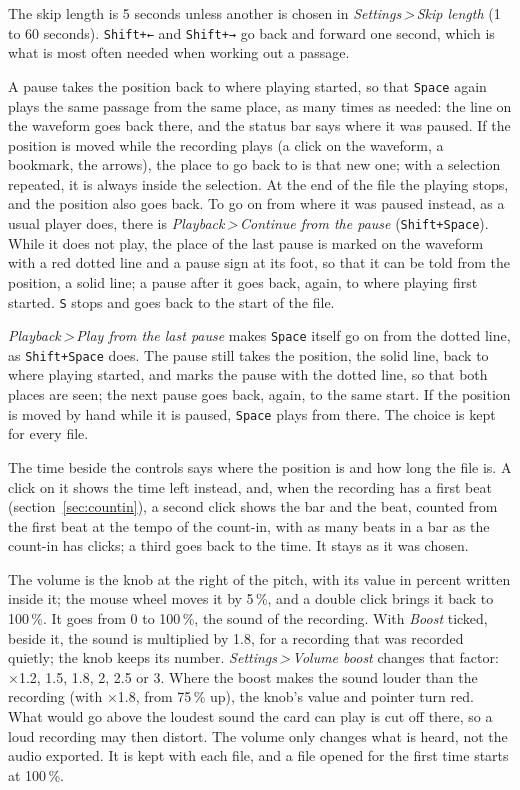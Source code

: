 \documentclass[12pt,
              article,
              oneside
              ]{memoir}
\newcommand*{\menu}[1]{\textit{#1}}
\newcommand*{\then}{\,>\,}
\newcommand*{\key}[1]{\texttt{#1}}
\begin{document}
\noindent{}%
The skip length is 5 seconds unless another is chosen in
\menu{Settings\then Skip length} (1 to 60 seconds).
\key{Shift+←} and \key{Shift+→} go back and forward one second, which is
what is most often needed when working out a passage.

%
A pause takes the position back to where playing started, so that
\key{Space} again plays the same passage from the same place, as many
times as needed: the line on the waveform goes back there, and the status
bar says where it was paused. If the position is moved while the recording
plays (a click on the waveform, a bookmark, the arrows), the place to go
back to is that new one; with a selection repeated, it is always inside
the selection. At the end of the file the playing stops, and the position
also goes back. To go on from where it was paused instead, as a usual
player does, there is \menu{Playback\then Continue from the pause}
(\key{Shift+Space}). While it does not play, the place of the last pause
is marked on the waveform with a red dotted line and a pause sign at its
foot, so that it can be told from the position, a solid line; a pause after it goes back, again, to where playing
first started. \key{S} stops and goes back to the start of the file.

%
\menu{Playback\then Play from the last pause} makes \key{Space} itself go
on from the dotted line, as \key{Shift+Space} does. The pause still takes
the position, the solid line, back to where playing started, and marks the
pause with the dotted line, so that both places are seen; the next pause
goes back, again, to the same start. If the position is moved by hand
while it is paused, \key{Space} plays from there. The choice is kept for
every file.

%
The time beside the controls says where the position is and how long the
file is. A click on it shows the time left instead, and, when the
recording has a first beat (section~\ref{sec:countin}), a second click
shows the bar and the beat, counted from the first beat at the tempo of
the count-in, with as many beats in a bar as the count-in has clicks;
a third goes back to the time. It stays as it was chosen.

%
The volume is the knob at the right of the pitch, with its value in percent
written inside it; the mouse wheel moves it by 5\,\%, and a double click
brings it back to 100\,\%. It goes from 0 to 100\,\%, the sound of the
recording. With \menu{Boost} ticked, beside it, the sound is multiplied by
1.8, for a recording that was recorded quietly; the knob keeps its number.
\menu{Settings\then Volume boost} changes that factor: \(\times\)1.2,
1.5, 1.8, 2, 2.5 or 3. Where the boost makes the sound louder than the
recording (with \(\times\)1.8, from 75\,\% up), the knob's value and
pointer turn red. What would go
above the loudest sound the card can play is cut off there, so a loud
recording may then distort. The volume only changes what is heard, not
the audio exported. It is kept with each file, and a file opened for the
first time starts at 100\,\%.
\end{document}
